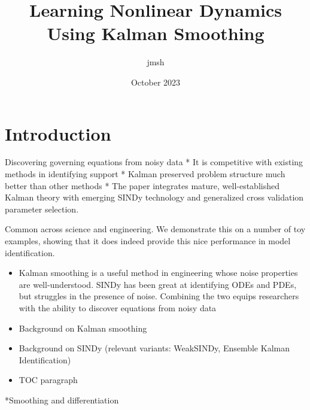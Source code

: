 \documentclass{article}
\title{Learning Nonlinear Dynamics Using Kalman Smoothing}
\author{jmsh}
\date{October 2023}
\begin{document}
\maketitle


\section{Introduction}
Discovering governing equations from noisy data 
* It is competitive with existing methods in identifying support
* Kalman preserved problem structure much better than other methods
* The paper integrates mature, well-established Kalman theory with emerging SINDy technology and generalized cross validation parameter selection.

Common across science and engineering.  We demonstrate this on a number of toy examples, showing that it does indeed provide this nice performance in model identification.
\begin{itemize}
    \item Kalman smoothing is a useful method in engineering whose noise properties are well-understood.  SINDy has been great at identifying ODEs and PDEs, but struggles in the presence of noise.  Combining the two equips researchers with the ability to discover equations from noisy data
    \item Background on Kalman smoothing
    \item Background on SINDy (relevant variants: WeakSINDy, Ensemble Kalman Identification)
    \item TOC paragraph
\end{itemize}
*Smoothing and differentiation
\end{document}
